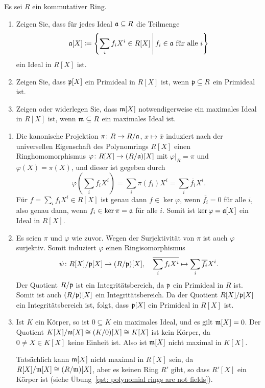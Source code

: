 \begin{question}
  Es sei $R$ ein kommutativer Ring.
  \begin{enumerate}
    \item
      Zeigen Sie, dass für jedes Ideal $\mathfrak{a} \subseteq R$ die Teilmenge
      \[
                  \mathfrak{a}[X]
        \coloneqq \left\{
                    \sum_i f_i X^i \in R[X]
                  \,\middle|\,
                    \text{$f_i \in \mathfrak{a}$ für alle $i$}
                  \right\}
      \]
      ein Ideal in $R[X]$ ist.
    \item
      Zeigen Sie, dass $\mathfrak{p}[X]$ ein Primideal in $R[X]$ ist, wenn $\mathfrak{p} \subseteq R$ ein Primideal ist.
    \item
      Zeigen oder widerlegen Sie, dass $\mathfrak{m}[X]$ notwendigerweise ein maximales Ideal in $R[X]$ ist, wenn $\mathfrak{m} \subseteq R$ ein maximales Ideal ist.
  \end{enumerate}
\end{question}


\begin{solution}
  \begin{enumerate}
    \item
      Die kanonische Projektion $\pi \colon R \to R/\mathfrak{a}$, $x \mapsto \overline{x}$ induziert nach der universellen Eigenschaft des Polynomrings $R[X]$ einen Ringhomomorphismus $\varphi \colon R[X] \to (R/\mathfrak{a})[X]$ mit $\varphi|_R = \pi$ und $\varphi(X) = \pi(X)$, und dieser ist gegeben durch
      \[
          \varphi\left( \sum_i f_i X^i \right)
        = \sum_i \pi(f_i) X^i
        = \sum_i \overline{f_i} X^i.
      \]
      Für $f = \sum_i f_i X^i \in R[X]$ ist genau dann $f \in \ker \varphi$, wenn $\overline{f_i} = 0$ für alle $i$, also genau dann, wenn $f_i \in \ker \pi = \mathfrak{a}$ für alle $i$.
      Somit ist $\ker \varphi = \mathfrak{a}[X]$ ein Ideal in $R[X]$.
    \item
      Es seien $\pi$ und $\varphi$ wie zuvor.
      Wegen der Surjektivität von $\pi$ ist auch $\varphi$ surjektiv.
      Somit induziert $\varphi$ einen Ringisomorphismus
      \[
        \psi \colon R[X]/\mathfrak{p}[X] \to (R/\mathfrak{p})[X],
        \quad
        \overline{\sum_i f_i X^i} \mapsto \sum_i \overline{f_i} X^i.
      \]
      Der Quotient $R/\mathfrak{p}$ ist ein Integritätsbereich, da $\mathfrak{p}$ ein Primideal in $R$ ist.
      Somit ist auch $(R/\mathfrak{p})[X]$ ein Integritätsbereich.
      Da der Quotient $R[X]/\mathfrak{p}[X]$ ein Integritätsbereich ist, folgt, dass $\mathfrak{p}[X]$ ein Primideal in $R[X]$ ist.
    \item
      Ist $K$ ein Körper, so ist $0 \subseteq K$ ein maximales Ideal, und es gilt $\mathfrak{m}[X] = 0$.
      Der Quotient $K[X]/\mathfrak{m}[X] \cong (K/0)[X] \cong K[X]$ ist kein Körper, da $0 \neq X \in K[X]$ keine Einheit ist.
      Also ist $\mathfrak{m}[X]$ nicht maximal in $K[X]$.
      
      Tatsächlich kann $\mathfrak{m}[X]$ nicht maximal in $R[X]$ sein, da $R[X]/\mathfrak{m}[X] \cong (R/\mathfrak{m})[X]$, aber es keinen Ring $R'$ gibt, so dass $R'[X]$ ein Körper ist (siehe Übung~\ref{qst: polynomial rings are not fields}).
  \end{enumerate}
\end{solution}


